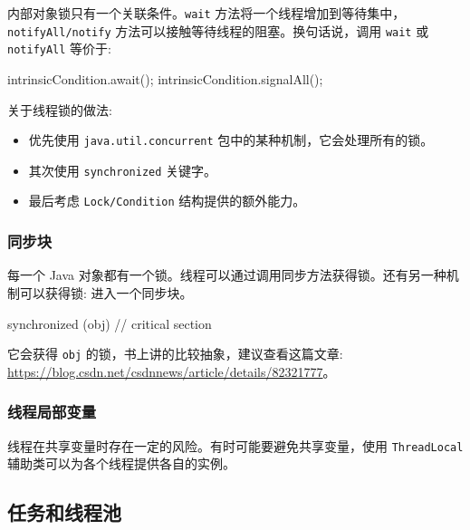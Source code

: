 内部对象锁只有一个关联条件。\texttt{wait} 方法将一个线程增加到等待集中，\texttt{notifyAll/notify} 方法可以接触等待线程的阻塞。换句话说，调用 \texttt{wait} 或 \texttt{notifyAll} 等价于:

\begin{Java}
intrinsicCondition.await();
intrinsicCondition.signalAll();
\end{Java}


关于线程锁的做法:
\begin{itemize}
    \item 优先使用 \texttt{java.util.concurrent} 包中的某种机制，它会处理所有的锁。
    \item 其次使用 \texttt{synchronized} 关键字。
    \item 最后考虑 \texttt{Lock/Condition} 结构提供的额外能力。
\end{itemize}

\subsubsection{同步块}

每一个 Java 对象都有一个锁。线程可以通过调用同步方法获得锁。还有另一种机制可以获得锁: 进入一个同步块。

\begin{Java}
synchronized (obj) {
    // critical section
}
\end{Java}

它会获得 \texttt{obj} 的锁，书上讲的比较抽象，建议查看这篇文章: \url{https://blog.csdn.net/csdnnews/article/details/82321777}。

\subsubsection{线程局部变量}

线程在共享变量时存在一定的风险。有时可能要避免共享变量，使用 \texttt{ThreadLocal} 辅助类可以为各个线程提供各自的实例。

\subsection{任务和线程池}

